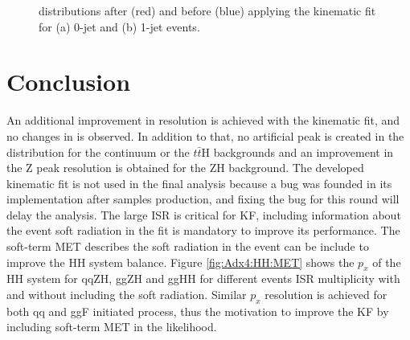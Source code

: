 \begin{figure}[htbp]
   \centering
   \begin{tcolorbox}[colback=black!5!white,colframe=white!75!black]
   \caption{\myy distributions after (red) and before (blue) applying the kinematic fit for (a) 0-jet and (b) 1-jet events.}
   \label{fig:Adx4:HH:myy}
   \end{tcolorbox}
   
\end{figure}


\section{Conclusion}

An additional improvement in \mbb resolution is achieved with the kinematic fit, and no changes in \myy is observed. In addition to that, no artificial peak is created in the \mbb distribution for the continuum or the $t\bar{t}$H backgrounds and an improvement in the Z peak resolution is obtained for the ZH background. The developed kinematic fit is not used in the final analysis because a bug was founded in its implementation after samples production, and fixing the bug for this round will delay the analysis. The large ISR is critical for \HHyybb KF, including information about the event soft radiation in the fit is mandatory to improve its performance. The soft-term MET describes the soft radiation in the event can be include to improve the HH system balance. Figure \ref{fig:Adx4:HH:MET} shows the $p_x$ of the HH system for qqZH, ggZH and ggHH for different events ISR multiplicity with and without including the soft radiation. Similar $p_x$ resolution is achieved for both qq and ggF initiated process, thus the motivation to improve the KF by including soft-term MET in the likelihood. 

